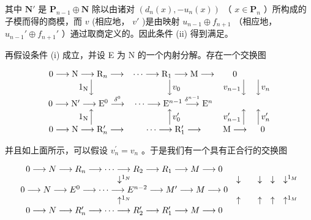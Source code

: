 其中 \(\mathbf{N}'\) 是 \(\mathbf{P}_{n-1} \oplus \mathbf{N}\) 除以由诸对 \((d_n(x), -u_n(x))\) （ \(x \in \mathbf{P}_n\) ）所构成的子模而得的商模，而 \(v\) (相应地， \(v'\) )是由映射 \(u_{n-1} \oplus f_{n+1}\) （相应地， \(u_{n-1}' \oplus f_{n+1}'\) ）通过取商定义的。因此条件 (ii) 得到满足。

再假设条件 (i) 成立，并设 E 为 N 的一个内射分解。存在一个交换图

\[
\begin{array}{c c c c c c c} 0 \longrightarrow \mathrm{N} \longrightarrow \mathrm{R} _ {n} \longrightarrow & \dots \longrightarrow \mathrm{R} _ {1} \longrightarrow \mathrm{M} \longrightarrow & 0 \\ 1 _ {\mathrm{N}} \Big \downarrow & \Big \downarrow v _ {0} & v _ {n - 1} \Big \downarrow & \Big \downarrow v _ {n} \\ 0 \longrightarrow \mathrm{N} ^ {\prime} \longrightarrow \mathrm{E} ^ {0} \stackrel {{\delta^ {0}}} {{\longrightarrow}} & \dots \longrightarrow \mathrm{E} ^ {n - 1} \stackrel {{\delta^ {n - 1}}} {{\longrightarrow}} \mathrm{E} ^ {n} \\ 1 _ {\mathrm{N}} \Big \uparrow & \Big \uparrow v _ {0} ^ {\prime} & v _ {n - 1} ^ {\prime} \Big \uparrow & \Big \uparrow v _ {n} ^ {\prime} \\ 0 \longrightarrow \mathrm{N} \longrightarrow \mathrm{R} _ {n} ^ {\prime} \longrightarrow & \dots \longrightarrow \mathrm{R} _ {1} ^ {\prime} \longrightarrow & \mathrm{M} \longrightarrow & 0 \end{array}
\]

并且如上面所示，可以假设 \(v_{n}^{\prime}=v_{n}\) 。于是我们有一个具有正合行的交换图

\[
\begin{array}{c c c c c c c c} 0 \longrightarrow N \longrightarrow R _ {n} \longrightarrow \dots \longrightarrow R _ {2} \longrightarrow R _ {1} \longrightarrow M \longrightarrow 0 \\ \downarrow^ {1 _ {N}} & \downarrow & & \downarrow & \downarrow & \downarrow^ {1 _ {M}} \\ 0 \longrightarrow N \longrightarrow E ^ {0} \longrightarrow \dots \longrightarrow E ^ {n - 2} \longrightarrow M ^ {\prime} \longrightarrow M \longrightarrow 0 \\ \uparrow^ {1 _ {N}} & \uparrow & & \uparrow & \uparrow & \uparrow^ {1 _ {M}} \\ 0 \longrightarrow N \longrightarrow R _ {n} ^ {\prime} \longrightarrow \dots \longrightarrow R _ {2} ^ {\prime} \longrightarrow R _ {1} ^ {\prime} \longrightarrow M \longrightarrow 0 \end{array}
\]

